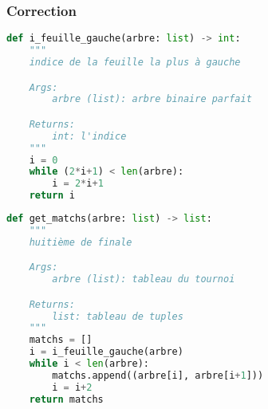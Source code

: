 \documentclass[svgnames,11pt]{beamer}
\begin{document}
\begin{frame}[fragile]
    \frametitle{Correction}

\begin{center}
\begin{lstlisting}[language=Python , basicstyle=\ttfamily\small, xleftmargin=1em, xrightmargin=1em]
def i_feuille_gauche(arbre: list) -> int:
    """
    indice de la feuille la plus à gauche

    Args:
        arbre (list): arbre binaire parfait

    Returns:
        int: l'indice
    """
    i = 0
    while (2*i+1) < len(arbre):
        i = 2*i+1
    return i
\end{lstlisting}
\end{center}   

\end{frame}
\begin{frame}[fragile]

\begin{center}
\begin{lstlisting}[language=Python , basicstyle=\ttfamily\small, xleftmargin=1em, xrightmargin=1em]
def get_matchs(arbre: list) -> list:
    """
    huitième de finale

    Args:
        arbre (list): tableau du tournoi

    Returns:
        list: tableau de tuples
    """
    matchs = []
    i = i_feuille_gauche(arbre)
    while i < len(arbre):
        matchs.append((arbre[i], arbre[i+1]))
        i = i+2
    return matchs
\end{lstlisting}
\end{center}   

\end{frame}
\end{document}
